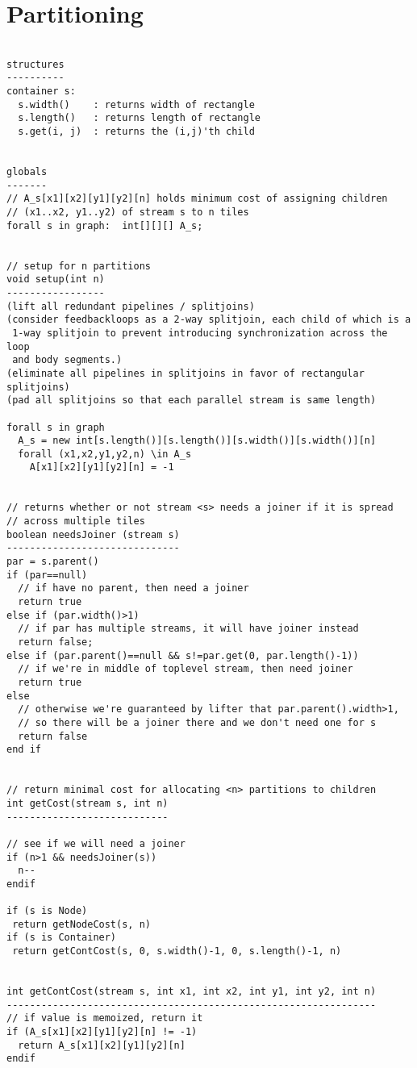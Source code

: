 \section{Partitioning}

\scriptsize
\begin{verbatim}

structures
----------
container s:
  s.width()    : returns width of rectangle
  s.length()   : returns length of rectangle
  s.get(i, j)  : returns the (i,j)'th child


globals
-------
// A_s[x1][x2][y1][y2][n] holds minimum cost of assigning children 
// (x1..x2, y1..y2) of stream s to n tiles
forall s in graph:  int[][][] A_s;


// setup for n partitions
void setup(int n) 
-----------------
(lift all redundant pipelines / splitjoins)
(consider feedbackloops as a 2-way splitjoin, each child of which is a
 1-way splitjoin to prevent introducing synchronization across the loop
 and body segments.)
(eliminate all pipelines in splitjoins in favor of rectangular splitjoins)
(pad all splitjoins so that each parallel stream is same length)

forall s in graph
  A_s = new int[s.length()][s.length()][s.width()][s.width()][n]
  forall (x1,x2,y1,y2,n) \in A_s
    A[x1][x2][y1][y2][n] = -1


// returns whether or not stream <s> needs a joiner if it is spread
// across multiple tiles
boolean needsJoiner (stream s)
------------------------------
par = s.parent()
if (par==null)
  // if have no parent, then need a joiner
  return true
else if (par.width()>1)
  // if par has multiple streams, it will have joiner instead
  return false;
else if (par.parent()==null && s!=par.get(0, par.length()-1))
  // if we're in middle of toplevel stream, then need joiner
  return true
else
  // otherwise we're guaranteed by lifter that par.parent().width>1,
  // so there will be a joiner there and we don't need one for s
  return false
end if


// return minimal cost for allocating <n> partitions to children
int getCost(stream s, int n)
----------------------------

// see if we will need a joiner
if (n>1 && needsJoiner(s)) 
  n--
endif

if (s is Node)
 return getNodeCost(s, n)
if (s is Container)
 return getContCost(s, 0, s.width()-1, 0, s.length()-1, n)


int getContCost(stream s, int x1, int x2, int y1, int y2, int n)
----------------------------------------------------------------
// if value is memoized, return it
if (A_s[x1][x2][y1][y2][n] != -1)
  return A_s[x1][x2][y1][y2][n]
endif


\end{verbatim}
